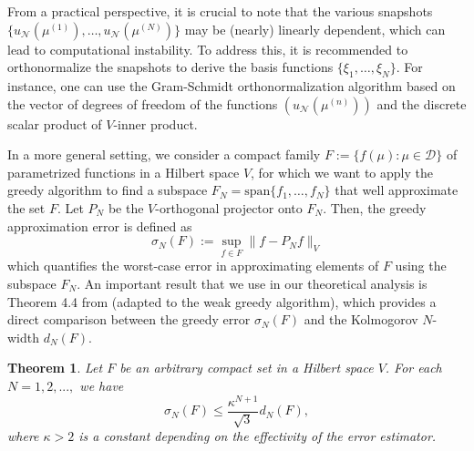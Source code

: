\documentclass[12pt]{article}
\newtheorem{theorem}{Theorem}[section]
\theoremstyle{remark}
\theoremstyle{definition}
\numberwithin{equation}{section}
\begin{document}
From a practical perspective, it is crucial to note that the various snapshots $\{ u_{\mathcal{N}}(\mu^{(1)}), \dots, u_{\mathcal{N}}(\mu^{(N)})\}$ may be (nearly) linearly dependent, which can lead to computational instability. To address this, it is recommended to orthonormalize the snapshots to derive the basis functions $\{ \xi_1, \dots, \xi_N \}$. For instance, one can use the Gram-Schmidt orthonormalization algorithm based on the vector of degrees of freedom of the functions $( u_{\mathcal{N}}(\mu^{(n)}) )$ and the discrete scalar product of $V$-inner product.

In a more general setting, we consider a compact family $F:=\{f(\mu):\mu \in \mathcal{D}\}$ of parametrized functions in a Hilbert space $V$, for which we want to apply the greedy algorithm to find a subspace $F_N=\text{span} \{f_1, \dots , f_N\}$ that well approximate the set $F$. Let $P_N$ be the $V$-orthogonal projector onto $F_N$. Then, the greedy approximation error is defined as
\begin{equation}
    \sigma_N(F):= \sup_{f \in F} \|f - P_N f\|_V
    \label{sigma_n}
\end{equation}
which quantifies the worst-case error in approximating elements of $F$ using the subspace $F_N$. An important result that we use in our theoretical analysis is Theorem 4.4 from \cite{binev2011convergence} (adapted to the weak greedy algorithm), which provides a direct comparison between  the greedy error $\sigma_N(F)$ and the Kolmogorov $N$-width $d_N(F)$.
\begin{theorem}
Let $F$ be an arbitrary compact set in a Hilbert space $V$. For each $N = 1, 2,...,$ we have
\begin{equation}
    \sigma_N(F) \leq \frac{\kappa ^{N+1}}{\sqrt{3}} d_N(F),
    \label{th comp}
\end{equation}
where $\kappa > 2$ is a constant depending on the effectivity of the error estimator.
\end{theorem}

\end{document}
